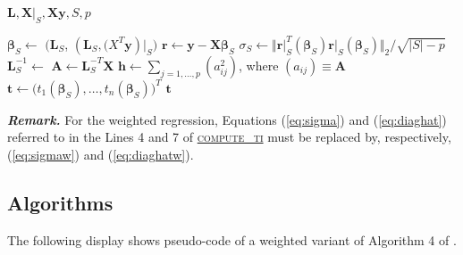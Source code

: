 \documentclass[a4paper,oneside,11pt,DIV=12]{scrartcl}
\begin{document}
\begin{algorithmic}[1]
		\hypertarget{alg:computeti}{
			{$\bm L, \bm X\vert_S, \bm X \bm y, S, p$}}
		\State $\bm \beta_S \gets$ 
			$\big(\bm L_S$, $(\bm L_S,
			\bm (X^T \bm y)\vert_S$$\big)$
		\State $\bm r \gets \bm y - \bm X  \bm \beta_S$
		\State $\sigma_S \gets \big\Vert \bm r\vert_S^T(\bm \beta_S)
			\bm r\vert_S(\bm \beta_S) \big \Vert_2 / \sqrt{\vert S \vert - p}$
		\State $\bm L_S^{-1} \gets$ 
		\State $\bm A \gets \bm L_S^{-T}\bm X$
		\State $\bm h \gets \sum_{j =1, \ldots, p} (a_{ij}^2)$, \quad
			where $(a_{ij}) \equiv \bm A$
		\State $\bm t \gets \big(t_1(\bm \beta_S), \ldots,
			t_n(\bm \beta_S)\big)^T$
		\State \Return $\bm t$
	\EndFunction
\end{algorithmic}

\vspace{2em}
\noindent\textbf{\sffamily \small \itshape Remark.} For the weighted
regression, Equations (\ref{eq:sigma}) and (\ref{eq:diaghat}) referred
to in the Lines 4 and 7 of  \hyperlink{alg:computeti}{\textsc{compute\_ti}}
must be replaced by, respectively, (\ref{eq:sigmaw}) and (\ref{eq:diaghatw}).

\subsection{Algorithms}
The following display shows pseudo-code of a weighted variant of Algorithm 4
of \citet{billor_hadi_etal_2000}.
\end{document}
